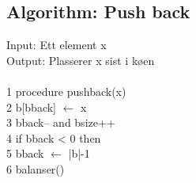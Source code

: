 \documentclass{article}%
\newcommand{\æ}{\textunderscore}
\newcommand{\å}{\iosevka}
\begin{document}
    \hspace{4mm}
    \begin{minipage}[t]{.48\linewidth}
        \subsection*{Algorithm: Push back} 
        {\sbweight Input:} Ett element {\å x}\\
        {\sbweight Output:} Plasserer {\iosevka x} sist i køen\\\\
        \iosevka
        \color{darkgray}
        1 procedure push\textunderscore back(x) \\
        2\hspace*{6mm} b[b\textunderscore back] $\leftarrow$ x\\
        3\hspace*{6mm} b\textunderscore back-- and b\æ size++\\
        4\hspace*{6mm} if b\textunderscore back < 0 then \\
        5\hspace*{12mm} b\textunderscore back $\leftarrow$ |b|-1 \\
        6\hspace*{6mm} balanser()  
    \end{minipage}\\\\\\\\
\end{document}
